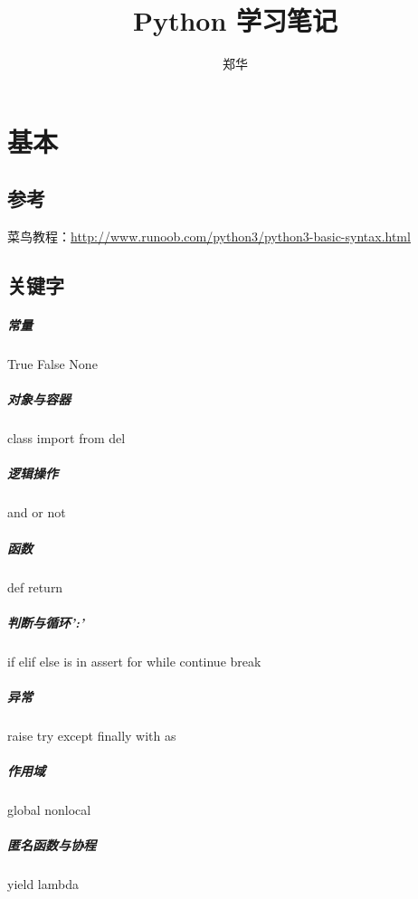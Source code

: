 \documentclass[UTF8,a4paper,12pt]{ctexbook}
\author{\kaishu 郑华}
\title{Python 学习笔记}
\begin{document}
 	\maketitle
 	\tableofcontents

\chapter{基本}
	\section{参考}
		菜鸟教程：\url{http://www.runoob.com/python3/python3-basic-syntax.html}
	\section{关键字}
		\paragraph{常量}True  False None
		
		\paragraph{对象与容器} class import from del
		
		\paragraph{逻辑操作} and or not
		
		\paragraph{函数} def return 
		
		\paragraph{判断与循环':'} if elif else is in assert for while continue break
		
		\paragraph{异常} raise try except finally with as
		
		\paragraph{作用域} global nonlocal
		
		\paragraph{匿名函数与协程} yield lambda
		
\end{document}

